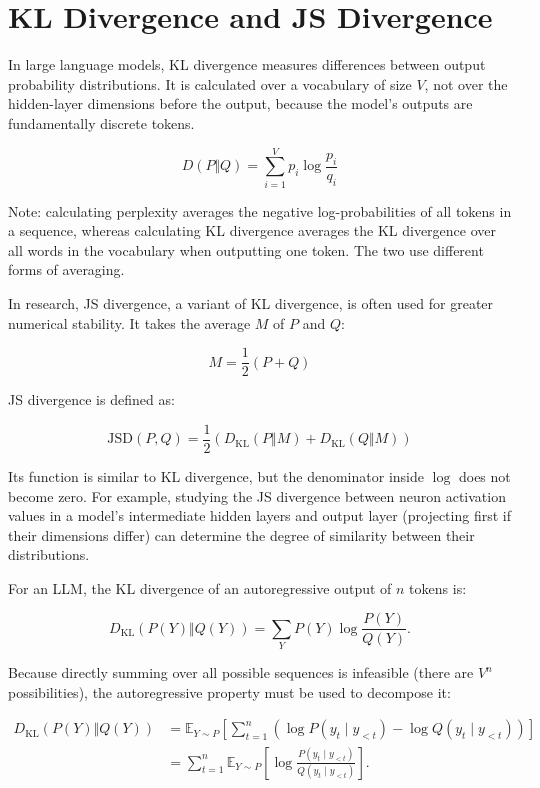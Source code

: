 \setcounter{section}{6}

\hypertarget{kl-divergence-and-js-divergence}{%
\section{KL Divergence and JS Divergence}\label{kl-divergence-and-js-divergence}}

In large language models, KL divergence measures differences between output probability distributions. It is calculated over a vocabulary of size \(V\), not over the hidden-layer dimensions before the output, because the model's outputs are fundamentally discrete tokens.

\[
D(P\Vert Q)=\sum_{i=1}^{V}p_i\log\frac{p_i}{q_i}
\]

Note: calculating perplexity averages the negative log-probabilities of all tokens in a sequence, whereas calculating KL divergence averages the KL divergence over all words in the vocabulary when outputting one token. The two use different forms of averaging.

In research, JS divergence, a variant of KL divergence, is often used for greater numerical stability. It takes the average \(M\) of \(P\) and \(Q\):

\[
M=\frac{1}{2}(P+Q)
\]

JS divergence is defined as:

\[
\mathrm{JSD}(P,Q)=\frac{1}{2}\left(D_{\mathrm{KL}}(P\Vert M)+D_{\mathrm{KL}}(Q\Vert M)\right)
\]

Its function is similar to KL divergence, but the denominator inside \(\log\) does not become zero. For example, studying the JS divergence between neuron activation values in a model's intermediate hidden layers and output layer (projecting first if their dimensions differ) can determine the degree of similarity between their distributions.

For an LLM, the KL divergence of an autoregressive output of \(n\) tokens is:

\[
D_{\mathrm{KL}}(P(Y)\Vert Q(Y))
=
\sum_Y P(Y)\log\frac{P(Y)}{Q(Y)}.
\]

Because directly summing over all possible sequences is infeasible (there are \(V^n\) possibilities), the autoregressive property must be used to decompose it:

\[
\begin{aligned}
D_{\mathrm{KL}}(P(Y)\Vert Q(Y))
&=\mathbb{E}_{Y\sim P}
\left[
\sum_{t=1}^{n}
\left(
\log P(y_t\mid y_{<t})-\log Q(y_t\mid y_{<t})
\right)
\right] \\
&=\sum_{t=1}^{n}
\mathbb{E}_{Y\sim P}
\left[
\log\frac{P(y_t\mid y_{<t})}{Q(y_t\mid y_{<t})}
\right].
\end{aligned}
\]

